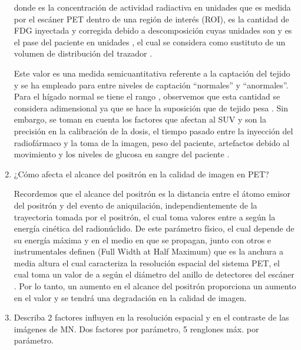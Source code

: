 \begin{enumerate}[1.]
donde  es la concentración de actividad radiactiva en unidades  que es medida por el escáner PET dentro de una región de interés (ROI),  es la cantidad de FDG inyectada y corregida debido a descomposición cuyas unidades son  y  es el pase del paciente en unidades , el cual se considera como sustituto de un volumen de distribución del trazador \citep{SUV2}. 


Este valor es una medida semicuantitativa referente a la captación del tejido  y se ha empleado para entre niveles de captación ``normales'' y ``anormales''.  Para el hígado normal se tiene el rango , observemos que esta cantidad se considera adimensional ya que se hace la suposición que  de tejido pesa  \citep{SUV1,SUV2}. Sin embargo, se toman en cuenta los factores que afectan al SUV y son la precisión en la calibración de la dosis, el tiempo pasado entre la inyección del radiofármaco y la toma de la imagen, peso del paciente, artefactos debido al movimiento y los niveles de glucosa en sangre del paciente \citep{SUV3}.




  \item ¿Cómo afecta el alcance del positrón en la calidad de imagen en PET?

Recordemos que el alcance del positrón es la distancia entre el átomo emisor del positrón y del evento de aniquilación, independientemente de la trayectoria tomada por el positrón, el cual toma valores entre  a  según la energía cinética del radionúclido. De este parámetro físico, el cual depende de su energía máxima y en el medio en que se propagan, junto con otros e instrumentales definen  (Full Width at Half Maximum) que es la anchura a media altura el cual caracteriza la resolución espacial del sistema PET, el cual toma un valor de  a  según el diámetro del anillo de detectores del escáner  \citep{cherry,range_posi}. Por lo tanto, un aumento en el alcance del positrón proporciona un aumento en el valor  y se tendrá una degradación en la calidad de imagen.


\pagebreak

  \item Describa 2 factores influyen en la resolución espacial y en el contraste de las imágenes de MN. Dos factores por parámetro, 5 renglones máx. por parámetro.
  


\end{enumerate}
